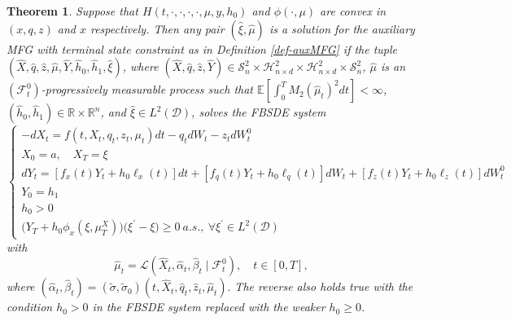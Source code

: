 \documentclass[11pt,a4paper]{article}
\newtheorem{theo}{Theorem}[section]
\begin{document}
\begin{theo} 
\label{verification}
Suppose that $H(t,\cdot, \cdot, \cdot, \cdot, \mu, y, h_0)$ and $\phi(\cdot, \mu)$ are convex in $(x,q, z)$ and $x$ respectively. 
Then any pair $(\hat \xi, \hat \mu )$ is a solution for the auxiliary MFG with terminal state constraint as in Definition \ref{def-auxMFG} if the tuple $( \hat X,   \hat q,  \hat z,  \hat \mu,   \hat Y,  \hat {h}_0, \hat {h}_1, \hat {\xi})$, where $( \hat X,   \hat q,  \hat z,  \hat Y) \in \mathcal S^2 _n \times \mathcal H^2 _{n\times d} \times \mathcal H^2 _{n\times d} \times \mathcal S^2 _n$, $\hat \mu$ is an $(\mathcal F_t ^0)$-progressively measurable process such that $\mathbb E \left[\int_0^T M_2(\hat \mu_t)^2 dt\right]<\infty$, $( \hat h_0,  \hat h_1) \in \mathbb R \times \mathbb R^n$, and $\hat \xi \in L^2(\mathcal D)$, solves the FBSDE system
\begin{equation}
\label{FBSDE MFG CN}
\begin{cases}
    -dX_t=f(t,X_t, q_t, z_t, \mu_t)dt -q_tdW_t-z_tdW_t^0\\
      X_0 =a, \quad X_T=\xi\\
    dY_t=[f_x(t)Y_t+h_0 \ell_x(t)]dt+[f _q(t)Y_t+h_0 \ell_q(t)]dW_t+[f_z(t)Y_t+h_0 \ell_z(t)]dW_t^0\\
        Y_0=h_1\\
        h_0 > 0\\
    \big( Y_T+h_0\phi_x(\xi,\mu_T^X)\big) \big(\xi^\prime -\xi \big) \geq 0 \ a.s., \ \forall \xi^\prime \in L^2(\mathcal{D})
\end{cases}
\end{equation}
with
\[\hat{\mu}_t=\mathcal{L}(\hat X_t, \hat \alpha_t , \hat {\beta}_t \mid \mathcal F_t ^0),   \quad  t\in [0,T],\]
where 
$ (\hat \alpha_t , \hat \beta_t ) = (\tilde \sigma, \tilde \sigma_0)(t, \hat X_t , \hat q_t , \hat z_t , \hat \mu_t ).$
The reverse also holds true with the condition $h_0 >0$ in the FBSDE system replaced with the weaker $h_0 \geq 0$.
\end{theo}
\end{document}
